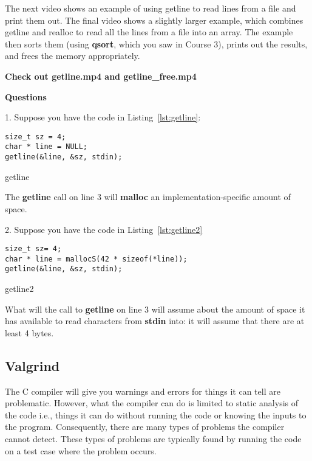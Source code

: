 \documentclass[11pt, a4paper]{article}
\begin{document}
The next video shows an example of using getline to read lines from a file and print them out. The final video shows a slightly larger example, which combines getline and realloc to read all the lines from a file into an array. The example then sorts them (using \textbf{qsort}, which you saw in Course 3), prints out the results, and frees the memory appropriately.




\textbf{Check out getline.mp4 and getline\_free.mp4}



\textbf{Questions}


1. Suppose you have the code in Listing~\ref{lst:getline}:

\begin{listing}
\begin{verbatim}
size_t sz = 4;
char * line = NULL;
getline(&line, &sz, stdin);
\end{verbatim}
\caption{getline}
\label{lst:getline}
\end{listing}


The \textbf{getline} call on line 3 will \textbf{malloc} an implementation-specific amount of space.



2. Suppose you have the code in Listing~\ref{lst:getline2}



\begin{listing}
\begin{verbatim}
size_t sz= 4;
char * line = mallocS(42 * sizeof(*line));
getline(&line, &sz, stdin);
\end{verbatim}
\caption{getline2}
\label{lst:getline2}
\end{listing}



What will the call to \textbf{getline} on line 3 will assume about the amount of space it has available to read characters from \textbf{stdin} into: it will assume that there are at least 4 bytes.



\subsection{Valgrind}%
\label{sub:valgrind}



The C compiler will give you warnings and errors for things it can tell are problematic. However, what the compiler can do is limited to static analysis of the code i.e., things it can do without running the code or knowing the inputs to the program. Consequently, there are many types of problems the compiler cannot detect. These types of problems are typically found by running the code on a test case where the problem occurs.
\end{document}
